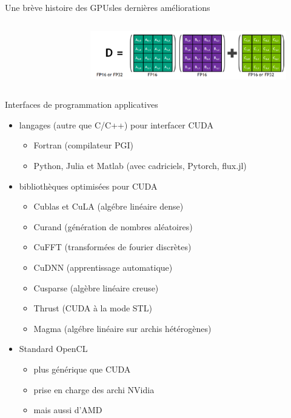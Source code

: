 \documentclass[11pt,mathserif]{beamer}
\begin{document}
\begin{frame}{Une brève histoire des GPUs}{les dernières améliorations}
\begin{columns}[t]
\begin{figure}[htbp]
 \end{figure}
\begin{figure}[htbp]
  \includegraphics[width=0.9\linewidth]{fig/flux2.png}
 \end{figure}
  \end{columns}
\end{frame}

\begin{frame}{Interfaces de programmation applicatives}
  \begin{itemize}[<+->]
    \item langages (autre que C/C++) pour interfacer CUDA
  \begin{itemize}
    \item Fortran (compilateur PGI)
    \item Python, Julia et Matlab (avec cadriciels, Pytorch, flux.jl)
  \end{itemize} 
    \item bibliothèques optimisées pour CUDA
  \begin{itemize}
    \item Cublas et CuLA (algébre linéaire dense)
    \item Curand (génération de nombres aléatoires)
    \item CuFFT (transformées de fourier discrètes)
    \item CuDNN (apprentissage automatique)
    \item Cusparse (algèbre linéaire creuse)
    \item Thrust (CUDA à la mode STL)
    \item Magma (algébre linéaire sur archis hétérogènes)
  \end{itemize} 
    \item Standard OpenCL
  \begin{itemize}
    \item plus générique que CUDA 
    \item prise en charge des archi NVidia
    \item mais aussi d'AMD 
  \end{itemize} 
  \end{itemize} 
\end{frame}
\end{document}
